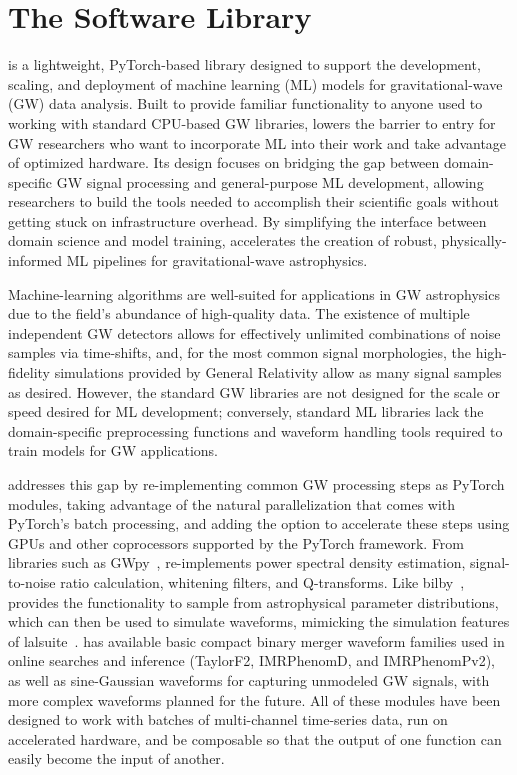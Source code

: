 \chapter{The \mlgw Software Library}
\label{app:ml4gw}
\begin{refsection}

\mlgw is a lightweight, PyTorch-based library designed to support the development, scaling, and deployment of machine learning (ML) models for gravitational-wave (GW) data analysis. 
Built to provide familiar functionality to anyone used to working with standard CPU-based GW libraries, \mlgw lowers the barrier to entry for GW researchers who want to incorporate ML into their work and take advantage of optimized hardware. 
Its design focuses on bridging the gap between domain-specific GW signal processing and general-purpose ML development, allowing researchers to build the tools needed to accomplish their scientific goals without getting stuck on infrastructure overhead. 
By simplifying the interface between domain science and model training, \mlgw accelerates the creation of robust, physically-informed ML pipelines for gravitational-wave astrophysics.

Machine-learning algorithms are well-suited for applications in GW astrophysics due to the field's abundance of high-quality data.
The existence of multiple independent GW detectors allows for effectively unlimited combinations of noise samples via time-shifts, and, for the most common signal morphologies, the high-fidelity simulations provided by General Relativity allow as many signal samples as desired.
However, the standard GW libraries are not designed for the scale or speed desired for ML development; conversely, standard ML libraries lack the domain-specific preprocessing functions and waveform handling tools required to train models for GW applications.

\mlgw addresses this gap by re-implementing common GW processing steps as PyTorch~\cite{paszke2019pytorch} modules, taking advantage of the natural parallelization that comes with PyTorch's batch processing, and adding the option to accelerate these steps using GPUs and other coprocessors supported by the PyTorch framework.
From libraries such as GWpy~\cite{2019ascl.soft12016M}, \mlgw re-implements power spectral density estimation, signal-to-noise ratio calculation, whitening filters, and Q-transforms.
Like bilby~\cite{Ashton_2019}, \mlgw provides the functionality to sample from astrophysical parameter distributions, which can then be used to simulate waveforms, mimicking the simulation features of lalsuite~\cite{lalsuite}.
\mlgw has available basic compact binary merger waveform families used in online searches and inference (TaylorF2, IMRPhenomD, and IMRPhenomPv2), as well as sine-Gaussian waveforms for capturing unmodeled GW signals, with more complex waveforms planned for the future.
All of these modules have been designed to work with batches of multi-channel time-series data, run on accelerated hardware, and be composable so that the output of one function can easily become the input of another.


\end{refsection}
